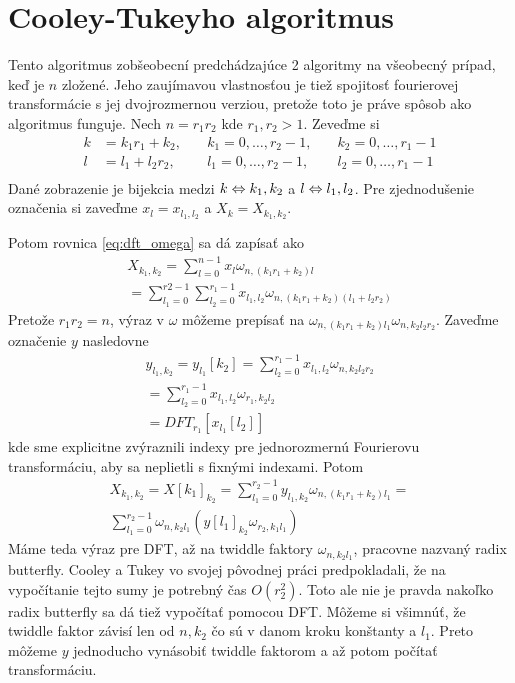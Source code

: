 \section{Cooley-Tukeyho algoritmus}
Tento algoritmus zobšeobecní predchádzajúce 2 algoritmy na
všeobecný prípad, keď je $n$ zložené. Jeho zaujímavou vlastnosťou je
tiež spojitosť fourierovej transformácie s jej dvojrozmernou verziou,
pretože toto je práve spôsob ako algoritmus funguje.
Nech $n=r_1 r_2$ kde $r_1,r_2>1$.
Zeveďme si
\begin{align}
    k &= k_1 r_1 + k_2, \quad &k_1 = 0,\dots,r_2-1, 
                \quad &k_2 = 0,\dots,r_1-1 \\
    l &= l_1  + l_2 r_2, \quad &l_1 = 0,\dots,r_2-1, 
                \quad &l_2 = 0,\dots,r_1-1 \\
\end{align}
Dané zobrazenie je bijekcia medzi $k \Leftrightarrow k_1,k_2$ a
$l \Leftrightarrow l_1,l_2$.
Pre zjednodušenie označenia si zaveďme $x_l = x_{l_1,l_2}$ a
$X_k = X_{k_1,k_2}$.

Potom rovnica \ref{eq:dft_omega} sa dá zapísať ako
\begin{equation}
    \begin{split}
    X_{k_1,k_2} = \sum_{l=0}^{n-1} x_l \omega_{n, (k_1 r_1 + k_2) l} \\
       = \sum_{l_1=0}^{r2-1} \sum_{l_2=0}^{r_1-1}
            x_{l_1,l_2} \omega_{n, (k_1 r_1 + k_2) (l_1 + l_2 r_2)}
    \end{split}
\end{equation}
Pretože $r_1 r_2 = n$, výraz v $\omega$ môžeme prepísať na
$\omega_{n, (k_1 r_1 + k_2) l_1} \omega_{n, k_2 l_2 r_2}$.
Zaveďme označenie $y$ nasledovne
\begin{equation}
    \begin{split}
    y_{l_1,k_2} = y_{l_1}[k_2] = 
        \sum_{l_2=0}^{r_1-1} x_{l_1,l_2} \omega_{n, k_2 l_2 r_2}  \\
       = \sum_{l_2=0}^{r_1-1} x_{l_1,l_2} \omega_{r_1, k_2 l_2}  \\        
        = DFT_{r_1}[x_{l_1}[l_2]]
    \end{split}
\end{equation}
kde sme explicitne zvýraznili indexy pre jednorozmernú Fourierovu
transformáciu, aby sa neplietli s fixnými indexami.
Potom 
\begin{equation}
    \begin{split}
    X_{k_1,k_2} = X[k_1]_{k_2}
     = \sum_{l_1=0}^{r_2-1} y_{l_1,k_2} \omega_{n,(k_1 r_1
    + k_2) l_1} =  \\
     \sum_{l_1=0}^{r_2-1}
     \omega_{n, k_2 l_1} \left( y[l_1]_{k_2} \omega_{r_2, k_1 l_1}
     \right)
    \end{split}
\end{equation}
Máme teda výraz pre DFT, až na twiddle faktory $\omega_{n,k_2 l_1}$,
pracovne nazvaný radix butterfly.
Cooley a Tukey vo svojej pôvodnej práci predpokladali, že na
vypočítanie tejto sumy je potrebný čas $O(r_2^2)$. 
Toto ale nie je pravda nakoľko radix butterfly sa dá tiež 
vypočítať pomocou DFT. Môžeme si všimnúť, že twiddle faktor závisí
len od $n, k_2$ čo sú v danom kroku konštanty a $l_1$. Preto môžeme
$y$ jednoducho vynásobiť twiddle faktorom a až potom počítať
transformáciu.

